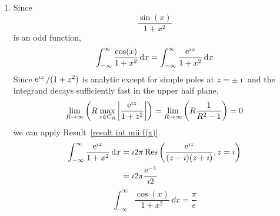 {\begin{Solution}
\begin{enumerate}
\[    \]
    The integrand is analytic on the real axis and has second order poles at
    $z = \pm \imath$.  Since the integrand decays sufficiently fast at infinity,
    \[
    \lim_{R \to \infty} \left( R \max_{z \in C_R} \left| \frac{z^2}{(z^2 + 1)^2} \right| \right)
    = \lim_{R \to \infty} \left( R \frac{R^2}{(R^2-1)^2} \right) = 0
    \]
    we can apply Result~\ref{result int mii f(x)}.
    \[
    \int_{-\infty}^\infty \frac{x^2}{(x^2 + 1)^2} \,\dd x
    = \imath 2 \pi \Res\left( \frac{z^2}{(z^2+1)^2}, z  = \imath \right)
    \]
    \begin{align*}
      \Res\left( \frac{z^2}{(z^2+1)^2}, z  = \imath \right)
      &= \lim_{z \to \imath} \frac{\dd}{\dd z} \left( 
        (z - \imath)^2 \frac{z^2}{(z^2+1)^2} \right) \\
      &= \lim_{z \to \imath} \frac{\dd}{\dd z} \left( \frac{z^2}{(z + \imath)^2} \right) \\
      &= \lim_{z \to \imath} \left( 
        \frac{(z + \imath)^2 2 z - z^2 2(z + \imath)}{(z + \imath)^4} \right) \\
      &= - \frac{\imath}{4}
    \end{align*}
    \[
    \boxed{
      \int_{-\infty}^\infty \frac{x^2}{(x^2 + 1)^2} \,\dd x = \frac{\pi}{2}
      }
    \]
  \item
    Since 
    \[
    \frac{\sin(x)}{1+x^2}
    \]
    is an odd function,
    \[
    \int_{-\infty}^\infty \frac{\cos(x)}{1+x^2} \,\mathrm{d} x
    = \int_{-\infty}^\infty \frac{\mathop{\mathrm{e}}\nolimits^{\imath x}}{1+x^2} \,\mathrm{d} x
    \]
    Since $\mathop{\mathrm{e}}\nolimits^{\imath z} / (1 + z^2)$ is analytic except for simple poles at $z = \pm \imath$ 
    and the integrand decays sufficiently fast in the upper half plane,
    \[
    \lim_{R \to \infty} \left( R \max_{z \in C_R} \left| \frac{\mathop{\mathrm{e}}\nolimits^{\imath z}}{1+z^2} \right| \right)
    = \lim_{R \to \infty} \left( R \frac{1}{R^2 - 1} \right) = 0
    \]
    we can apply Result~\ref{result int mii f(x)}.
    \begin{align*}
      \int_{-\infty}^\infty \frac{\mathop{\mathrm{e}}\nolimits^{\imath x}}{1+x^2} \,\mathrm{d} x
      &= \imath 2 \pi \mathop{\mathrm{Res}}\nolimits \left( \frac{\mathop{\mathrm{e}}\nolimits^{\imath z}}{(z - \imath)(z + \imath)}, z = \imath \right) \\
      &= \imath 2 \pi \frac{\mathop{\mathrm{e}}\nolimits^{-1}}{\imath 2}
    \end{align*}
    \[
    \boxed{
      \int_{-\infty}^\infty \frac{\cos(x)}{1+x^2} \,\dd x = \frac{\pi}{e}
      }
    \]
  \end{enumerate}
\end{Solution}










}
